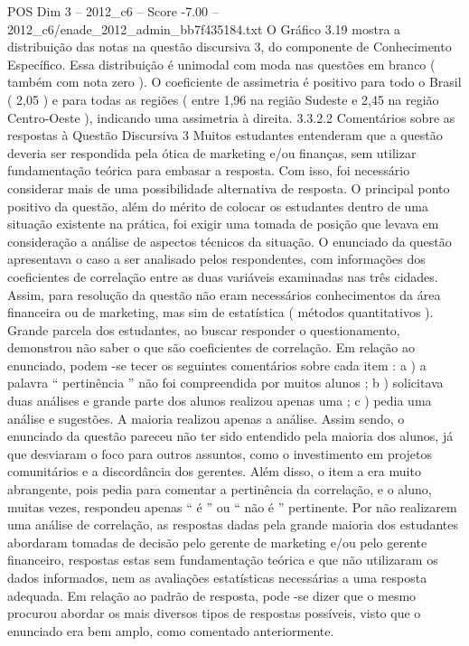 \begin{textsample}{POS Dim 3 – 2012\_c6 – Score -7.00 – 2012\_c6/enade\_2012\_admin\_bb7f435184.txt}
O Gráfico 3.19 mostra a distribuição das notas na questão discursiva 3, do componente de Conhecimento Específico.
Essa distribuição é unimodal com moda nas questões em branco ( também com nota zero ).
O coeficiente de assimetria é positivo para todo o Brasil ( 2,05 ) e para todas as regiões ( entre 1,96 na região Sudeste e 2,45 na região Centro-Oeste ), indicando uma assimetria à direita. 3.3.2.2 Comentários sobre as respostas à Questão Discursiva 3 Muitos estudantes entenderam que a questão deveria ser respondida pela ótica de marketing e/ou finanças, sem utilizar fundamentação teórica para embasar a resposta.
Com isso, foi necessário considerar mais de uma possibilidade alternativa de resposta.
O principal ponto positivo da questão, além do mérito de colocar os estudantes dentro de uma situação existente na prática, foi exigir uma tomada de posição que levava em consideração a análise de aspectos técnicos da situação.
O enunciado da questão apresentava o caso a ser analisado pelos respondentes, com informações dos coeficientes de correlação entre as duas variáveis examinadas nas três cidades.
Assim, para resolução da questão não eram necessários conhecimentos da área financeira ou de marketing, mas sim de estatística ( métodos quantitativos ).
Grande parcela dos estudantes, ao buscar responder o questionamento, demonstrou não saber o que são coeficientes de correlação.
Em relação ao enunciado, podem -se tecer os seguintes comentários sobre cada item : a ) a palavra “ pertinência ” não foi compreendida por muitos alunos ; b ) solicitava duas análises e grande parte dos alunos realizou apenas uma ; c ) pedia uma análise e sugestões.
A maioria realizou apenas a análise.
Assim sendo, o enunciado da questão pareceu não ter sido entendido pela maioria dos alunos, já que desviaram o foco para outros assuntos, como o investimento em projetos comunitários e a discordância dos gerentes.
Além disso, o item a era muito abrangente, pois pedia para comentar a pertinência da correlação, e o aluno, muitas vezes, respondeu apenas “ é ” ou “ não é ” pertinente.
Por não realizarem uma análise de correlação, as respostas dadas pela grande maioria dos estudantes abordaram tomadas de decisão pelo gerente de marketing e/ou pelo gerente financeiro, respostas estas sem fundamentação teórica e que não utilizaram os dados informados, nem as avaliações estatísticas necessárias a uma resposta adequada.
Em relação ao padrão de resposta, pode -se dizer que o mesmo procurou abordar os mais diversos tipos de respostas possíveis, visto que o enunciado era bem amplo, como comentado anteriormente.

\end{textsample}
